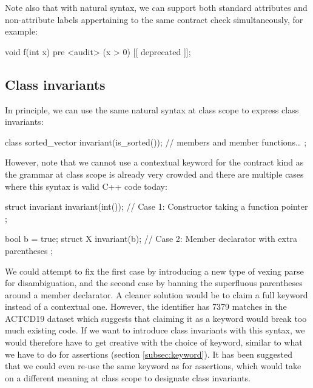 Note also that with natural syntax, we can support both standard attributes and non-attribute labels appertaining to the same contract check simultaneously, for example:

\begin{codeblock}
void f(int x)
  pre <audit> (x > 0) [[ deprecated ]];
\end{codeblock}


\subsection{Class invariants}
\label{subsec:invariants}

In principle, we can use the same natural syntax at class scope to express class invariants:

\begin{codeblock}
class sorted_vector {
  invariant(is_sorted());
  // members and member functions…
};
\end{codeblock}

However, note that we cannot use a contextual keyword for the contract kind  as the grammar at class scope is already very crowded and there are multiple cases where this syntax is valid C++ code today:

\begin{codeblock}
struct invariant {
  invariant(int());   // Case 1: Constructor taking a function pointer
};

bool b = true;
struct X {
  invariant(b);   // Case 2: Member declarator with extra parentheses
};
\end{codeblock}

We could attempt to fix the first case by introducing a new type of vexing parse for disambiguation, and the second case by banning the superfluous parentheses around a member declarator. A cleaner solution would be to claim a full keyword instead of a contextual one. However, the identifier  has 7379 matches in the ACTCD19 dataset which suggests that claiming it as a keyword would break too much existing code. If we want to introduce class invariants with this syntax, we would therefore have to get creative with the choice of keyword, similar to what we have to do for assertions (section \ref{subsec:keyword}). It has been suggested that we could even re-use the same keyword as for assertions, which would take on a different meaning at class scope to designate class invariants.

